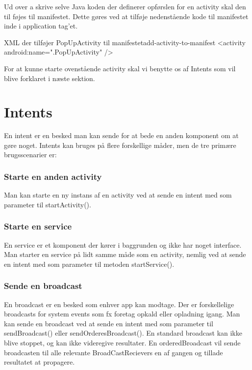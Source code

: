 Ud over a skrive selve Java koden der definerer opførslen for en activity skal den til føjes til manifestet. Dette gøres ved at tilføje nedenstående kode til manifestet inde i application tag'et.

\begin{example}\noindent
	\begin{XmlCode}{XML der tilføjer PopUpActivity til manifestet}{add-activity-to-manifest}
		<activity android:name=".PopUpActivity" />
	\end{XmlCode}
\end{example}

For at kunne starte ovenstående activity skal vi benytte os af Intents som vil blive forklaret i næste sektion.


\section{Intents}

En intent er en besked man kan sende for at bede en anden komponent om at gøre noget. Intents kan bruges på flere forskellige måder, men de tre primære brugsscenarier er:

\subsubsection{Starte en anden activity}

Man kan starte en ny instans af en activity ved at sende en intent med som parameter til startActivity(). 

\subsubsection{Starte en service}

En service er et komponent der kører i baggrunden og ikke har noget interface. Man starter en service på lidt samme måde som en activity, nemlig ved at sende en intent med som parameter til metoden startService().

\subsubsection{Sende en broadcast}

En broadcast er en besked som enhver app kan modtage. Der er forskellelige broadcasts for system events som fx foretag opkald eller opladning igang. Man kan sende en broadcast ved at sende en intent med som parameter til sendBroadcast() eller sendOrderesBroadcast().
En standard broadcast kan ikke blive stoppet, og kan ikke videregive resultater. En orderedBroadcast vil sende broadcasten til alle relevante BroadCastRecievers en af gangen og tillade resultatet at propagere.

